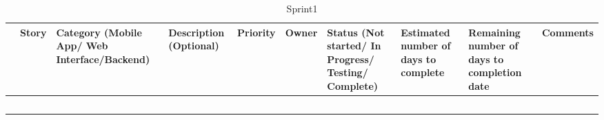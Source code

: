 \documentclass[11pt,a4paper,titlepage]{article}
\begin{document}

\begin{landscape}
\begin{table}[h]
\centering
\caption{Sprint1}
\label{Sprint1}
\begin{tabular}{|p{1cm}||p{2cm}||p{3cm}||p{3cm}||p{1.5cm}||p{1.5cm}||p{2cm}||p{2cm}||p{2cm}||p{3cm}|}
\hline
&{\bf Story} & {\bf Category \newline (Mobile App/ Web Interface/Backend)}  
& {\bf Description (Optional)} & {\bf Priority} & {\bf Owner} & {\bf Status (Not started/ In Progress/ Testing/ \newline Complete)} 
&  {\bf Estimated number of days to complete} & {\bf Remaining number of days to completion date} & {\bf Comments} \\ \hline
 &                                                    &                  &                              &                &             &                                                            &                                             &                                                   &                  \\ \hline
 &                                                    &                  &                              &                &             &                                                            &                                             &                                                   &                  \\ \hline
 &                                                    &                  &                              &                &             &                                                            &                                             &                                                   &                  \\ \hline
 &                                                    &                  &                              &                &             &                                                            &                                             &                                                   &                  \\ \hline
 &                                                    &                  &                              &                &             &                                                            &                                             &                                                   &                  \\ \hline

\end{tabular}
\end{table}
\end{landscape}
\end{document}
